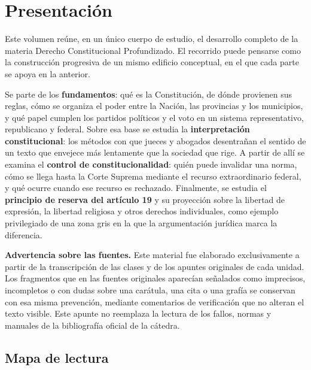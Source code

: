 \documentclass[12pt,oneside]{book}
\newcommand{\materia}{Derecho Constitucional Profundizado}
\begin{document}
\chapter*{Presentación}

Este volumen reúne, en un único cuerpo de estudio, el desarrollo completo de la materia \materia. El recorrido puede pensarse como la construcción progresiva de un mismo edificio conceptual, en el que cada parte se apoya en la anterior.

Se parte de los \textbf{fundamentos}: qué es la Constitución, de dónde provienen sus reglas, cómo se organiza el poder entre la Nación, las provincias y los municipios, y qué papel cumplen los partidos políticos y el voto en un sistema representativo, republicano y federal. Sobre esa base se estudia la \textbf{interpretación constitucional}: los métodos con que jueces y abogados desentrañan el sentido de un texto que envejece más lentamente que la sociedad que rige. A partir de allí se examina el \textbf{control de constitucionalidad}: quién puede invalidar una norma, cómo se llega hasta la Corte Suprema mediante el recurso extraordinario federal, y qué ocurre cuando ese recurso es rechazado. Finalmente, se estudia el \textbf{principio de reserva del artículo 19} y su proyección sobre la libertad de expresión, la libertad religiosa y otros derechos individuales, como ejemplo privilegiado de una zona gris en la que la argumentación jurídica marca la diferencia.

\begin{important}
\textbf{Advertencia sobre las fuentes.} Este material fue elaborado exclusivamente a partir de la transcripción de las clases y de los apuntes originales de cada unidad. Los fragmentos que en las fuentes originales aparecían señalados como imprecisos, incompletos o con dudas sobre una carátula, una cita o una grafía se conservan con esa misma prevención, mediante comentarios de verificación que no alteran el texto visible. Este apunte no reemplaza la lectura de los fallos, normas y manuales de la bibliografía oficial de la cátedra.
\end{important}

\section*{Mapa de lectura}
\end{document}
